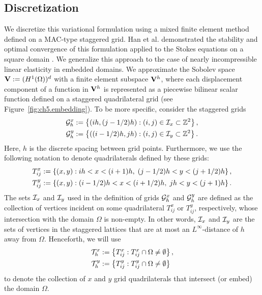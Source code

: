 \subsection{Discretization} \label{subsec:ch5.discretization}

We discretize this variational formulation using a mixed finite element method defined on a MAC-type staggered grid. Han et al. demonstrated the stability and optimal convergence of this formulation applied to the Stokes equations on a square domain \cite{Han.Houde98}. We generalize this approach to the case of nearly incompressible linear elasticity in embedded domains. We approximate the Sobolev space $\mathbf{V} := (H^1(\Omega))^d$ with a finite element subspace $\mathbf{V}^h$, where each displacement component of a function in $\mathbf{V}^h$ is represented as a piecewise bilinear scalar function defined on a staggered quadrilateral grid (see Figure~\ref{fig:ch5.embedding}). To be more specific, consider the staggered grids
\begin{align*}
\mathcal{G}^x_h & := \left\lbrace  (ih, (j-1/2)h) : (i,j) \in \mathcal{I}_x \subset \mathbb{Z}^2  \right\rbrace, \\
\mathcal{G}^y_h & := \left\lbrace  ((i-1/2)h, jh) : (i,j) \in \mathcal{I}_y \subset \mathbb{Z}^2  \right\rbrace.
\end{align*}
Here, $h$ is the discrete spacing between grid points. Furthermore, we use the following notation to denote quadrilaterals defined by these grids:
\begin{align*}
T^x_{ij} & := \left\lbrace  (x,y) : ih < x < (i+1)h, \; (j-1/2)h < y < (j+1/2)h  \right\rbrace, \\
T^y_{ij} & := \left\lbrace  (x,y) : (i-1/2)h < x < (i+1/2)h, \; jh < y < (j+1)h  \right\rbrace.
\end{align*}
The sets $\mathcal{I}_x$ and $\mathcal{I}_y$ used in the definition of grids $\mathcal{G}^x_h$ and $\mathcal{G}^y_h$ are defined as the collection of vertices incident on some quadrilateral $T^x_{ij}$ or $T^y_{ij}$, respectively, whose intersection with the domain $\Omega$ is non-empty. In other words, $\mathcal{I}_x$ and $\mathcal{I}_y$ are the sets of vertices in the staggered lattices that are at most an $L^{\infty}$-distance of $h$ away from $\Omega$. Henceforth, we will use
\begin{align*}
\mathcal{T}^x_h & := \left\lbrace  T^x_{ij} : T^x_{ij} \cap \Omega \neq \emptyset  \right\rbrace, \\
\mathcal{T}^y_h & := \left\lbrace  T^y_{ij} : T^y_{ij} \cap \Omega \neq \emptyset  \right\rbrace
\end{align*}
to denote the collection of $x$ and $y$ grid quadrilaterals that intersect (or embed) the domain $\Omega$.

